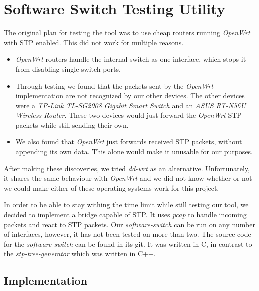\chapter{Software Switch Testing Utility}
\label{switch}
The original plan for testing the tool was to use cheap routers running \textit{OpenWrt}\cite{OpenWrt} with STP enabled.
This did not work for multiple reasons.
\begin{itemize}
    \item \textit{OpenWrt} routers handle the internal switch as one interface, which stops it from disabling single switch ports.
    \item Through testing we found that the packets sent by the \textit{OpenWrt} implementation are not recognized by our other devices.
    The other devices were a \textit{TP-Link TL-SG2008 Gigabit Smart Switch} and an \textit{ASUS RT-N56U Wireless Router}.
    These two devices would just forward the \textit{OpenWrt} STP packets while still sending their own.
    \item We also found that \textit{OpenWrt} just forwards received STP packets, without appending its own data.
    This alone would make it unusable for our purposes.
\end{itemize}

After making these discoveries, we tried \textit{dd-wrt}\cite{dd-wrt} as an alternative.
Unfortunately, it shares the same behaviour with \textit{OpenWrt} and we did not know whether or not we could make either of these operating systems work for this project.

In order to be able to stay withing the time limit while still testing our tool, we decided to implement a bridge capable of STP.
It uses \textit{pcap} to handle incoming packets and react to STP packets.
Our \textit{software-switch} can be run on any number of interfaces, however, it has not been tested on more than two.
The source code for the \textit{software-switch} can be found in its git\cite{software-switch}.
It was written in C, in contrast to the \textit{stp-tree-generator} which was written in C++.

\section{Implementation}
